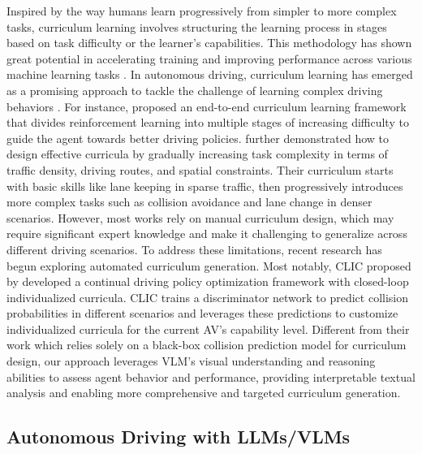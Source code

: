 Inspired by the way humans learn progressively from simpler to more complex tasks, curriculum learning \citep{bengio2009curriculum} involves structuring the learning process in stages based on task difficulty or the learner’s capabilities. This methodology has shown great potential in accelerating training and improving performance across various machine learning tasks \citep{wang2021survey}. In autonomous driving, curriculum learning has emerged as a promising approach to tackle the challenge of learning complex driving behaviors \citep{qiao2018automatically,ozturk2021investigating,khaitan2022state,peng2024reward}. For instance, \cite{anzalone2022end} proposed an end-to-end curriculum learning framework that divides reinforcement learning into multiple stages of increasing difficulty to guide the agent towards better driving policies. \cite{peiss2023graph} further demonstrated how to design effective curricula by gradually increasing task complexity in terms of traffic density, driving routes, and spatial constraints. Their curriculum starts with basic skills like lane keeping in sparse traffic, then progressively introduces more complex tasks such as collision avoidance and lane change in denser scenarios. 
However, most works rely on manual curriculum design, which may require significant expert knowledge and make it challenging to generalize across different driving scenarios. To address these limitations, recent research has begun exploring automated curriculum generation. Most notably, CLIC proposed by \cite{niu2024continual} developed a continual driving policy optimization framework with closed-loop individualized curricula. CLIC trains a discriminator network to predict collision probabilities in different scenarios and leverages these predictions to customize individualized curricula for the current AV's capability level.
Different from their work which relies solely on a black-box collision prediction model for curriculum design, our approach leverages VLM's visual understanding and reasoning abilities to assess agent behavior and performance, providing interpretable textual analysis and enabling more comprehensive and targeted curriculum generation.


\subsection{Autonomous Driving with LLMs/VLMs}

